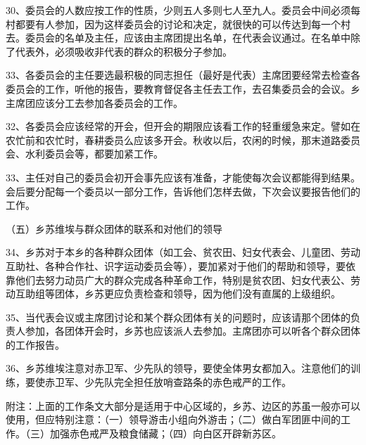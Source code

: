 30、委员会的人数应按工作的性质，少则五人多则七人至九人。委员会中间必须每村都要有人参加，因为这样委员会的讨论和决定，就很快的可以传达到每一个村去。委员会的名单及主任，应该由主席团提出名单，在代表会议通过。在名单中除了代表外，必须吸收非代表的群众的积极分子参加。

33、各委员会的主任要选最积极的同志担任（最好是代表）主席团要经常去检查各委员会的工作，听他的报告，要教育督促各主任去工作，去召集委员会的会议。乡主席团应该分工去参加各委员会的工作。

32、各委员会应该经常的开会，但开会的期限应该看工作的轻重缓急来定。譬如在农忙前和农忙时，春耕委员么应该多开会。秋收以后，农闲的时候，那末道路委员会、水利委员会等，都要加紧工作。

33、主任对自己的委员会初开会事先应该有准备，才能使每次会议都能得到结果。会后要分配每一个委员以一部分工作，告诉他们怎样去做，下次会议要报告他们的工作。

（五）乡苏维埃与群众团体的联系和对他们的领导

34、乡苏对于本乡的各种群众团体（如工会、贫农田、妇女代表会、儿童团、劳动互助社、各种合作社、识字运动委员会等），要加紧对于他们的帮助和领导，要依靠他们去努力动员广大的群众完成各种革命工作，特别是贫农团、妇女代表公、劳动互助组等团体，乡苏更应负责检查和领导，因为他们没有直属的上级组织。

35、当代表会议或主席团讨论和某个群众团体有关的问题时，应该请那个团体的负责人参加，各团体开会时，乡苏也应该派人去参加。主席团亦可以听各个群众团体的工作报告。

36、乡苏维埃注意对赤卫军、少先队的领导，要使全体男女都加入。注意他们的训练，要使赤卫军、少先队完全担任放哨查路条的赤色戒严的工作。

附注：上面的工作条文大部分是适用于中心区域的，乡苏、边区的苏虽一般亦可以使用，但应特别注意：（一）领导游击小组向外游击；（二）做白军团匪中间的工作。（三）加强赤色戒严及粮食储藏；（四）向白区开辟新苏区。

